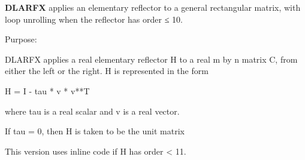 {\bfseries D\+L\+A\+R\+F\+X} applies an elementary reflector to a general rectangular matrix, with loop unrolling when the reflector has order ≤ 10. 

 \begin{DoxyParagraph}{Purpose\+: }
\begin{DoxyVerb} DLARFX applies a real elementary reflector H to a real m by n
 matrix C, from either the left or the right. H is represented in the
 form

       H = I - tau * v * v**T

 where tau is a real scalar and v is a real vector.

 If tau = 0, then H is taken to be the unit matrix

 This version uses inline code if H has order < 11.\end{DoxyVerb}
 
\end{DoxyParagraph}

